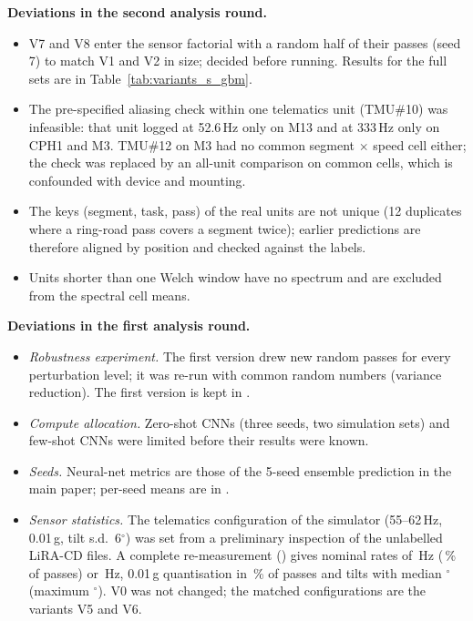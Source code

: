 \documentclass[onecolumn,10pt]{IEEEtran}
\begin{document}
\textbf{Deviations in the second analysis round.}
\begin{itemize}
\item V7 and V8 enter the sensor factorial with a random half of their passes (seed 7) to match V1 and V2 in size; decided before running. Results for the full sets are in Table~\ref{tab:variants_s_gbm}.
\item The pre-specified aliasing check within one telematics unit (TMU\#10) was infeasible: that unit logged at 52.6\,Hz only on M13 and at 333\,Hz only on CPH1 and M3. TMU\#12 on M3 had no common segment $\times$ speed cell either; the check was replaced by an all-unit comparison on common cells, which is confounded with device and mounting.
\item The keys (segment, task, pass) of the real units are not unique (12 duplicates where a ring-road pass covers a segment twice); earlier predictions are therefore aligned by position and checked against the labels.
\item Units shorter than one Welch window have no spectrum and are excluded from the spectral cell means.
\end{itemize}

\textbf{Deviations in the first analysis round.}
\begin{itemize}
\item \emph{Robustness experiment.} The first version drew new random passes for every perturbation level; it was re-run with common random numbers (variance reduction). The first version is kept in .
\item \emph{Compute allocation.} Zero-shot CNNs (three seeds, two simulation sets) and few-shot CNNs were limited before their results were known.
\item \emph{Seeds.} Neural-net metrics are those of the 5-seed ensemble prediction in the main paper; per-seed means are in .
\item \emph{Sensor statistics.} The telematics configuration of the simulator (55--62\,Hz, 0.01\,g, tilt s.d.\ 6$^\circ$) was set from a preliminary inspection of the unlabelled LiRA-CD files. A complete re-measurement () gives nominal rates of \liraRateLow\,Hz (\liraRateLowShare\,\% of passes) or \liraRateHigh\,Hz, 0.01\,g quantisation in \liraLsbShare\,\% of passes and tilts with median \liraTiltMedian$^\circ$ (maximum \liraTiltMax$^\circ$). V0 was not changed; the matched configurations are the variants V5 and V6.
\end{itemize}
\end{document}

